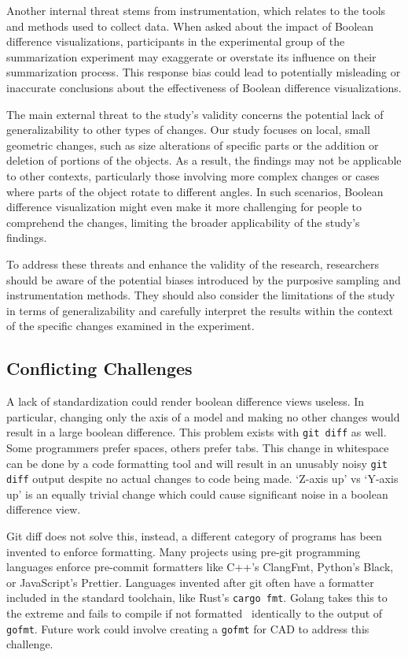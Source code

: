 \documentclass[sigconf,authorversion,nonacm]{acmart}
\begin{document}
Another internal threat stems from instrumentation, which relates to the tools and methods used to collect data. When asked about the impact of Boolean difference visualizations, participants in the experimental group of the summarization experiment may exaggerate or overstate its influence on their summarization process.
This response bias could lead to potentially misleading or inaccurate conclusions about the effectiveness of Boolean difference visualizations.

The main external threat to the study's validity concerns the potential lack of generalizability to other types of changes. Our study focuses on local, small geometric changes, such as size alterations of specific parts or the addition or deletion of portions of the objects.
As a result, the findings may not be applicable to other contexts, particularly those involving more complex changes or cases where parts of the object rotate to different angles.
In such scenarios, Boolean difference visualization might even make it more challenging for people to comprehend the changes, limiting the broader applicability of the study's findings.

To address these threats and enhance the validity of the research, researchers should be aware of the potential biases introduced by the purposive sampling and instrumentation methods.
They should also consider the limitations of the study in terms of generalizability and carefully interpret the results within the context of the specific changes examined in the experiment.

\subsection{Conflicting Challenges}

A lack of standardization could render boolean difference views useless.
In particular, changing only the axis of a model and making no other changes would result in a large boolean difference.
This problem exists with \texttt{git diff} as well.
Some programmers prefer spaces, others prefer tabs.
This change in whitespace can be done by a code formatting tool and will result in an unusably noisy \texttt{git diff} output despite no actual changes to code being made.
`Z-axis up' vs `Y-axis up' is an equally trivial change which could cause significant noise in a boolean difference view.

Git diff does not solve this, instead, a different category of programs has been invented to enforce formatting.
Many projects using pre-git programming languages enforce pre-commit formatters like C++'s ClangFmt, Python's Black, or JavaScript's Prettier.
Languages invented after git often have a formatter included in the standard toolchain, like Rust's \texttt{cargo fmt}.
Golang takes this to the extreme and fails to compile if not formatted~\cite{golangfaq} identically to the output of \texttt{gofmt}.
Future work could involve creating a \texttt{gofmt} for CAD to address this challenge.
\end{document}
